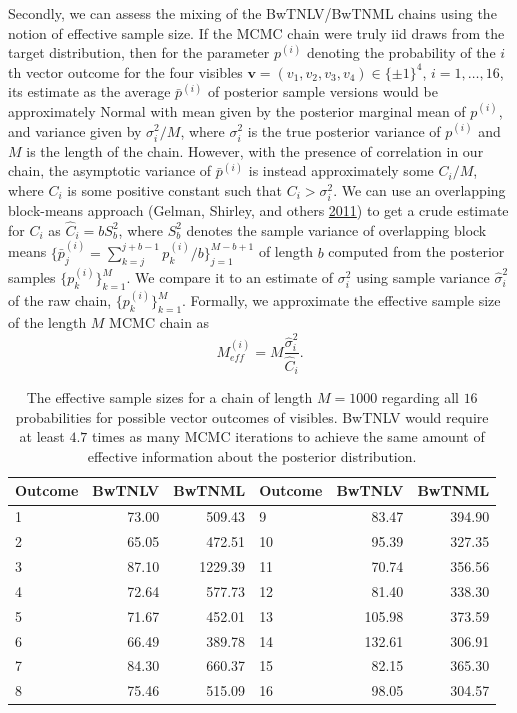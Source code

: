 \documentclass[12pt]{article}
\theoremstyle{definition}
\begin{document}
Secondly, we can assess the mixing of the BwTNLV/BwTNML chains using the
notion of effective sample size. If the MCMC chain were truly iid draws
from the target distribution, then for the parameter \(p^{(i)}\)
denoting the probability of the \(i\)th vector outcome for the four
visibles \(\mathbf{v}=(v_1,v_2,v_3,v_4)\in\{\pm 1\}^4\),
\(i=1,\ldots,16\), its estimate as the average \(\bar{p}^{(i)}\) of
posterior sample versions would be approximately Normal with mean given
by the posterior marginal mean of \(p^{(i)}\), and variance given by
\(\sigma^2_i/M\), where \(\sigma^2_i\) is the true posterior variance of
\(p^{(i)}\) and \(M\) is the length of the chain. However, with the
presence of correlation in our chain, the asymptotic variance of
\(\bar{p}^{(i)}\) is instead approximately some \(C_i/M\), where \(C_i\)
is some positive constant such that \(C_i > \sigma^2_i\). We can use an
overlapping block-means approach (Gelman, Shirley, and others
\protect\hyperlink{ref-gelman2011inference}{2011}) to get a crude
estimate for \(C_i\) as \(\hat{C}_i = bS_b^2\), where \(S_b^2\) denotes
the sample variance of overlapping block means
\(\{\bar{p}_j^{(i)}=\sum_{k=j}^{j+b-1} p_k^{(i)}/b\}_{j=1}^{M-b+1}\) of
length \(b\) computed from the posterior samples
\(\{p_k^{(i)}\}_{k=1}^M\). We compare it to an estimate of
\(\sigma^2_i\) using sample variance \(\hat{\sigma}^2_i\) of the raw
chain, \(\{p_k^{(i)}\}_{k=1}^{M}\). Formally, we approximate the
effective sample size of the length \(M\) MCMC chain as \[
M_{eff}^{(i)} = M\frac{\hat{\sigma}^2_i}{\hat{C}_i}.
\]
\begin{table}[ht]
\centering
\begin{tabular}{lrrlrr}
  \hline
Outcome & BwTNLV & BwTNML & Outcome & BwTNLV & BwTNML \\ 
  \hline
1 & 73.00 & 509.43 & 9 & 83.47 & 394.90 \\ 
  2 & 65.05 & 472.51 & 10 & 95.39 & 327.35 \\ 
  3 & 87.10 & 1229.39 & 11 & 70.74 & 356.56 \\ 
  4 & 72.64 & 577.73 & 12 & 81.40 & 338.30 \\ 
  5 & 71.67 & 452.01 & 13 & 105.98 & 373.59 \\ 
  6 & 66.49 & 389.78 & 14 & 132.61 & 306.91 \\ 
  7 & 84.30 & 660.37 & 15 & 82.15 & 365.30 \\ 
  8 & 75.46 & 515.09 & 16 & 98.05 & 304.57 \\ 
   \hline
\end{tabular}
\caption{The effective sample sizes for a chain of length $M = 1000$ regarding all $16$ probabilities for possible vector outcomes of visibles. BwTNLV would require at least $4.7$ times as many MCMC iterations to achieve the same amount of effective information about the posterior distribution.} 
\label{tab:m-eff}
\end{table}
\end{document}
